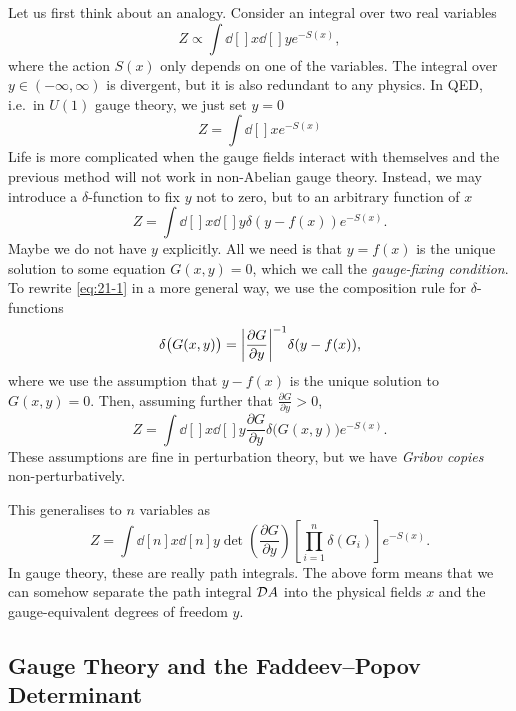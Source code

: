Let us first think about an analogy. Consider an integral over two real variables
\begin{equation}
  Z \propto \int \dd[]{x} \dd[]{y} e^{-S(x)},
\end{equation}
where the action $S(x)$ only depends on one of the variables.
The integral over $y \in (-\infty, \infty)$ is divergent, but it is also redundant to any physics.
In QED, i.e.~in $U(1)$ gauge theory, we just set $y = 0$
\begin{equation}
  Z = \int \dd[]{x} e^{- S(x)}
\end{equation}
Life is more complicated when the gauge fields interact with themselves and the previous method will not work in non-Abelian gauge theory.
Instead, we may introduce a $\delta$-function to fix $y$ not to zero, but to an arbitrary function of $x$
\begin{equation}
  \label{eq:21-1}
  Z = \int \dd[]{x} \dd[]{y} \delta(y - f(x)) e^{-S(x)}.
\end{equation}
Maybe we do not have $y$ explicitly. All we need is that $y = f(x)$ is the unique solution to some equation $G(x, y) = 0$, which we call the \emph{gauge-fixing condition}.
To rewrite \eqref{eq:21-1} in a more general way, we use the composition rule for $\delta$-functions
\begin{equation}
  \delta\bigl(G(x, y)\bigr) = \abs{\frac{\partial G}{\partial y}}^{-1} \delta(y - f(x)),
\end{equation}
where we use the assumption that $y - f(x)$ is the unique solution to $G(x, y) = 0$.
Then, assuming further that $\frac{\partial G}{\partial y} > 0$, 
\begin{equation}
  Z = \int \dd[]{x} \dd[]{y} \frac{\partial G}{\partial y} \delta\bigl(G(x, y)\bigr) e^{-S(x)}.
\end{equation}
These assumptions are fine in perturbation theory, but we have \emph{Gribov copies} non-perturbatively.

This generalises to $n$ variables as
\begin{equation}
  Z = \int \dd[n]{x} \dd[n]{y} \det(\frac{\partial G}{\partial y}) \left[ \prod_{i = 1}^n \delta(G_i) \right] e^{-S(x)}.
\end{equation}
In gauge theory, these are really path integrals. The above form means that we can somehow separate the path integral $\mathop{\mathcal{D} A}$ into the physical fields $x$ and the gauge-equivalent degrees of freedom $y$.

\subsection{Gauge Theory and the Faddeev--Popov Determinant}%
\label{sub:gauge_theory_and_fp_determinant}

